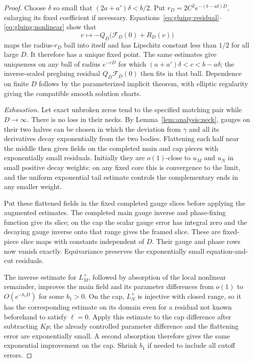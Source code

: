 \begin{proof}
Choose $\delta$ so small that
$(2a+a')\delta<b/2$.  Put
$r_D=2C^2e^{-(b-a\delta)D}$, enlarging its fixed coefficient if
necessary.  Equations~\eqref{eq:gluing:residual}--\eqref{eq:gluing:nonlinear}
show that
\[
 v\longmapsto-Q_D\bigl(\mathcal F_D(0)+R_D(v)\bigr)
\]
maps the radius-$r_D$ ball into itself and has Lipschitz constant
less than $1/2$ for all large $D$.  It therefore has a unique fixed
point.  The same estimates give uniqueness on any ball of radius
$e^{-cD}$ for which
$(a+a')\delta<c<b-a\delta$; the inverse-scaled pregluing residual
$Q_D\mathcal F_D(0)$ then fits in that ball.  Dependence on finite $D$ follows by the
parameterized implicit theorem, with elliptic regularity giving
the compatible smooth solution charts.

\emph{Exhaustion.}
Let exact unbroken zeros tend to the specified matching pair while
$D\to\infty$.  There is no loss in their necks.  By
Lemma~\ref{lem:analysis:neck}, gauges on their two halves can be
chosen in which the deviation from $\gamma$ and all its derivatives
decay exponentially from the two bodies.  Flattening each half
near the middle then gives fields on the completed main and cap
pieces with exponentially small residuals.  Initially they are
$o(1)$-close to $u_M$ and $u_N$ in small positive decay weights:
on any fixed core this is convergence to the limit, and the
uniform exponential tail estimate controls the complementary
ends in any smaller weight.

Put these flattened fields in the fixed completed gauge slices
before applying the augmented estimates.  The completed main
gauge inverse and phase-fixing function give its slice; on the
cap the scalar gauge error has integral zero and the decaying
gauge inverse onto that range gives the framed slice.  These
are fixed-piece slice maps with constants independent of $D$.
Their gauge and phase rows now vanish exactly.  Equivariance
preserves the exponentially small equation-and-cut residuals.

The inverse estimate for $L_M^+$, followed by absorption of the
local nonlinear remainder, improves the main field and its
parameter differences from $o(1)$ to $O(e^{-b_1D})$ for some
$b_1>0$.  On the cap, $L_N^+$ is injective with closed range, so
it has the corresponding estimate on its domain even for a
residual not known beforehand to satisfy $\ell=0$.  Apply this
estimate to the cap difference after subtracting $Kp$; the already
controlled parameter difference and the flattening error are
exponentially small.  A second absorption therefore gives the
same exponential improvement on the cap.  Shrink $b_1$ if needed
to include all cutoff errors.


\end{proof}
